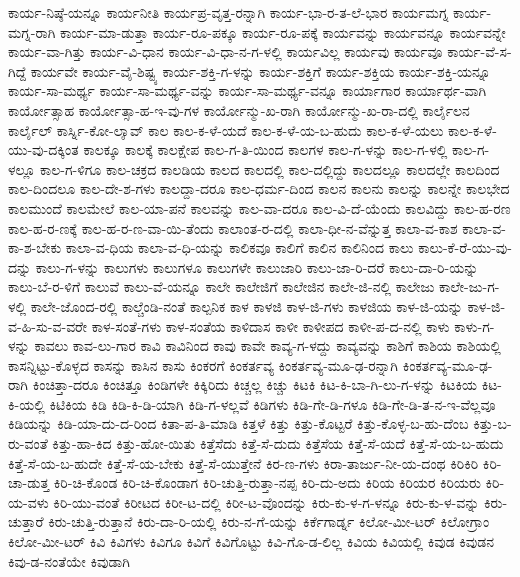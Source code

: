 {ಕಾರ್ಯ-ನಿಷ್ಠೆ-ಯನ್ನೂ
ಕಾರ್ಯನೀತಿ
ಕಾರ್ಯಪ್ರ-ವೃತ್ತ-ರನ್ನಾಗಿ
ಕಾರ್ಯ-ಭಾ-ರ-ತ-ಲೆ-ಭಾರ
ಕಾರ್ಯಮಗ್ನ
ಕಾರ್ಯ-ಮಗ್ನ-ರಾಗಿ
ಕಾರ್ಯ-ಮಾ-ಡುತ್ತಾ
ಕಾರ್ಯ-ರೂ-ಪಕ್ಕೂ
ಕಾರ್ಯ-ರೂ-ಪಕ್ಕೆ
ಕಾರ್ಯವನ್ನು
ಕಾರ್ಯವನ್ನೂ
ಕಾರ್ಯವನ್ನೇ
ಕಾರ್ಯ-ವಾ-ಗಿತ್ತು
ಕಾರ್ಯ-ವಿ-ಧಾನ
ಕಾರ್ಯ-ವಿ-ಧಾ-ನ-ಗ-ಳಲ್ಲಿ
ಕಾರ್ಯವಿಲ್ಲ
ಕಾರ್ಯವು
ಕಾರ್ಯವೂ
ಕಾರ್ಯ-ವೆ-ಸ-ಗಿದ್ದೆ
ಕಾರ್ಯವೇ
ಕಾರ್ಯ-ವೈ-ಶಿಷ್ಟ್ಯ
ಕಾರ್ಯ-ಶಕ್ತಿ-ಗ-ಳನ್ನು
ಕಾರ್ಯ-ಶಕ್ತಿಗೆ
ಕಾರ್ಯ-ಶಕ್ತಿಯ
ಕಾರ್ಯ-ಶಕ್ತಿ-ಯನ್ನೂ
ಕಾರ್ಯ-ಸಾ-ಮರ್ಥ್ಯ
ಕಾರ್ಯ-ಸಾ-ಮರ್ಥ್ಯ-ವನ್ನು
ಕಾರ್ಯ-ಸಾ-ಮರ್ಥ್ಯ-ವನ್ನೂ
ಕಾರ್ಯಾಗಾರ
ಕಾರ್ಯಾರ್ಥ-ವಾಗಿ
ಕಾರ್ಯೋತ್ಸಾಹ
ಕಾರ್ಯೋತ್ಸಾ-ಹ-ಇ-ವು-ಗಳ
ಕಾರ್ಯೋನ್ಮು-ಖ-ರಾಗಿ
ಕಾರ್ಯೋನ್ಮು-ಖ-ರಾ-ದಲ್ಲಿ
ಕಾರ್ಲೈಲನ
ಕಾರ್ಲೈಲ್
ಕಾರ್ಸ್ನಿ-ಕೋ-ಲಾೖವ್
ಕಾಲ
ಕಾಲ-ಕ-ಳೆ-ಯದೆ
ಕಾಲ-ಕ-ಳೆ-ಯ-ಬ-ಹುದು
ಕಾಲ-ಕ-ಳೆ-ಯಲು
ಕಾಲ-ಕ-ಳೆ-ಯು-ವು-ದಕ್ಕಿಂತ
ಕಾಲಕ್ಕೂ
ಕಾಲಕ್ಕೆ
ಕಾಲಕ್ಷೇಪ
ಕಾಲ-ಗ-ತಿ-ಯಿಂದ
ಕಾಲಗಳ
ಕಾಲ-ಗ-ಳನ್ನು
ಕಾಲ-ಗ-ಳಲ್ಲಿ
ಕಾಲ-ಗ-ಳಲ್ಲೂ
ಕಾಲ-ಗ-ಳಿಗೂ
ಕಾಲ-ಚಕ್ರದ
ಕಾಲಡಿಯ
ಕಾಲದ
ಕಾಲದಲ್ಲಿ
ಕಾಲ-ದಲ್ಲಿದ್ದು
ಕಾಲದಲ್ಲೂ
ಕಾಲದಲ್ಲೇ
ಕಾಲದಿಂದ
ಕಾಲ-ದಿಂದಲೂ
ಕಾಲ-ದೇ-ಶ-ಗಳು
ಕಾಲದ್ದಾ-ದರೂ
ಕಾಲ-ಧರ್ಮ-ದಿಂದ
ಕಾಲನ
ಕಾಲನು
ಕಾಲನ್ನು
ಕಾಲನ್ನೇ
ಕಾಲಭೇದ
ಕಾಲಮುಂದೆ
ಕಾಲಮೇಲೆ
ಕಾಲ-ಯಾ-ಪನೆ
ಕಾಲವನ್ನು
ಕಾಲ-ವಾ-ದರೂ
ಕಾಲ-ವಿ-ದೆ-ಯೆಂದು
ಕಾಲವಿದ್ದು
ಕಾಲ-ಹ-ರಣ
ಕಾಲ-ಹ-ರ-ಣಕ್ಕೆ
ಕಾಲ-ಹ-ರ-ಣ-ವಾ-ಯಿ-ತೆಂದು
ಕಾಲಾಂತ-ರ-ದಲ್ಲಿ
ಕಾಲಾ-ಧೀ-ನ-ವೆನ್ನುತ್ತ
ಕಾಲಾ-ವ-ಕಾಶ
ಕಾಲಾ-ವ-ಕಾ-ಶ-ಬೇಕು
ಕಾಲಾ-ವ-ಧಿಯ
ಕಾಲಾ-ವ-ಧಿ-ಯನ್ನು
ಕಾಲಿಕವೂ
ಕಾಲಿಗೆ
ಕಾಲಿನ
ಕಾಲಿನಿಂದ
ಕಾಲು
ಕಾಲು-ಕೆ-ರೆ-ಯು-ವು-ದನ್ನು
ಕಾಲು-ಗ-ಳನ್ನು
ಕಾಲುಗಳು
ಕಾಲುಗಳೂ
ಕಾಲುಗಳೇ
ಕಾಲುಜಾರಿ
ಕಾಲು-ಜಾ-ರಿ-ದರೆ
ಕಾಲು-ದಾ-ರಿ-ಯನ್ನು
ಕಾಲು-ಬೆ-ರ-ಳಿಗೆ
ಕಾಲುವೆ
ಕಾಲು-ವೆ-ಯನ್ನೂ
ಕಾಲೇ
ಕಾಲೇಜಿಗೆ
ಕಾಲೇಜಿನ
ಕಾಲೇ-ಜಿ-ನಲ್ಲಿ
ಕಾಲೇಜು
ಕಾಲೇ-ಜು-ಗ-ಳಲ್ಲಿ
ಕಾಲೇ-ಜೊಂದ-ರಲ್ಲಿ
ಕಾಲ್ಚೆಂಡಿ-ನಂತೆ
ಕಾಲ್ಪನಿಕ
ಕಾಳ
ಕಾಳಜಿ
ಕಾಳ-ಜಿ-ಗಳು
ಕಾಳಜಿಯ
ಕಾಳ-ಜಿ-ಯನ್ನು
ಕಾಳ-ಜಿ-ವ-ಹಿ-ಸು-ವ-ವರೇ
ಕಾಳ-ಸಂತೆ-ಗಳು
ಕಾಳ-ಸಂತೆಯ
ಕಾಳಿದಾಸ
ಕಾಳೀ
ಕಾಳೀಪದ
ಕಾಳೀ-ಪ-ದ-ನಲ್ಲಿ
ಕಾಳು
ಕಾಳು-ಗ-ಳನ್ನು
ಕಾವಲು
ಕಾವ-ಲು-ಗಾರ
ಕಾವಿ
ಕಾವಿನಿಂದ
ಕಾವು
ಕಾವೇ
ಕಾವ್ಯ-ಗ-ಳದ್ದು
ಕಾವ್ಯವನ್ನು
ಕಾಶಿಗೆ
ಕಾಶಿಯ
ಕಾಶಿಯಲ್ಲಿ
ಕಾಸನ್ನಿಟ್ಟು-ಕೊಳ್ಳದ
ಕಾಸನ್ನು
ಕಾಸಿನ
ಕಾಸು
ಕಿಂಕರಗೆ
ಕಿಂಕರ್ತವ್ಯ
ಕಿಂಕರ್ತವ್ಯ-ಮೂ-ಢ-ರನ್ನಾಗಿ
ಕಿಂಕರ್ತವ್ಯ-ಮೂ-ಢ-ರಾಗಿ
ಕಿಂಚಿತ್ತಾ-ದರೂ
ಕಿಂಚಿತ್ತೂ
ಕಿಂಡಿಗಳೇ
ಕಿಕ್ಕಿರಿದು
ಕಿಚ್ಚಲ್ಲ
ಕಿಚ್ಚು
ಕಿಟಕಿ
ಕಿಟ-ಕಿ-ಬಾ-ಗಿ-ಲು-ಗ-ಳನ್ನು
ಕಿಟಕಿಯ
ಕಿಟ-ಕಿ-ಯಲ್ಲಿ
ಕಿಟಿಕಿಯ
ಕಿಡಿ
ಕಿಡಿ-ಕಿ-ಡಿ-ಯಾಗಿ
ಕಿಡಿ-ಗ-ಳಲ್ಲವೆ
ಕಿಡಿಗಳು
ಕಿಡಿ-ಗೇ-ಡಿ-ಗಳೂ
ಕಿಡಿ-ಗೇ-ಡಿ-ತ-ನ-ಇ-ವೆಲ್ಲವೂ
ಕಿಡಿಯನ್ನು
ಕಿಡಿ-ಯಾ-ದು-ದ-ರಿಂದ
ಕಿತಾ-ಪ-ತಿ-ಮಾಡಿ
ಕಿತ್ತಳೆ
ಕಿತ್ತು
ಕಿತ್ತು-ಕೊಟ್ಟರೆ
ಕಿತ್ತು-ಕೊಳ್ಳ-ಬ-ಹು-ದೆಂಬ
ಕಿತ್ತು-ಬ-ರು-ವಂತೆ
ಕಿತ್ತು-ಹಾ-ಕಿದ
ಕಿತ್ತು-ಹೋ-ಯಿತು
ಕಿತ್ತೆಸೆದು
ಕಿತ್ತೆ-ಸೆ-ದುದು
ಕಿತ್ತೆಸೆಯ
ಕಿತ್ತೆ-ಸೆ-ಯದೆ
ಕಿತ್ತೆ-ಸೆ-ಯ-ಬ-ಹುದು
ಕಿತ್ತೆ-ಸೆ-ಯ-ಬ-ಹುದೇ
ಕಿತ್ತೆ-ಸೆ-ಯ-ಬೇಕು
ಕಿತ್ತೆ-ಸೆ-ಯುತ್ತೇನೆ
ಕಿರ-ಣ-ಗಳು
ಕಿರಾ-ತಾರ್ಜು-ನೀ-ಯ-ದಂಥ
ಕಿರಿಕಿರಿ
ಕಿರಿ-ಚಾ-ಡುತ್ತ
ಕಿರಿ-ಚಿ-ಕೊಂಡ
ಕಿರಿ-ಚಿ-ಕೊಂಡಾಗ
ಕಿರಿ-ಚುತ್ತಿ-ರುತ್ತಾ-ನಪ್ಪ
ಕಿರಿ-ದು-ಅದು
ಕಿರಿಯ
ಕಿರಿಯರ
ಕಿರಿಯರು
ಕಿರಿ-ಯ-ವಳು
ಕಿರಿ-ಯು-ವಂತೆ
ಕಿರೀಟದ
ಕಿರೀ-ಟ-ದಲ್ಲಿ
ಕಿರೀ-ಟ-ವೊಂದನ್ನು
ಕಿರು-ಕು-ಳ-ಗ-ಳನ್ನೂ
ಕಿರು-ಕು-ಳ-ವನ್ನು
ಕಿರು-ಚುತ್ತಾರೆ
ಕಿರು-ಚುತ್ತಿ-ರುತ್ತಾನೆ
ಕಿರು-ದಾ-ರಿ-ಯಲ್ಲಿ
ಕಿರು-ನ-ಗೆ-ಯನ್ನು
ಕಿರ್ಕೆಗಾರ್ಡ್ನ
ಕಿಲೋ-ಮೀ-ಟರ್
ಕಿಲೋಗ್ರಾಂ
ಕಿಲೋ-ಮೀ-ಟರ್
ಕಿವಿ
ಕಿವಿಗಳು
ಕಿವಿಗೂ
ಕಿವಿಗೆ
ಕಿವಿಗೊಟ್ಟು
ಕಿವಿ-ಗೊ-ಡ-ಲಿಲ್ಲ
ಕಿವಿಯ
ಕಿವಿಯಲ್ಲಿ
ಕಿವುಡ
ಕಿವುಡನ
ಕಿವು-ಡ-ನಂತೆಯೇ
ಕಿವುಡಾಗಿ
}
